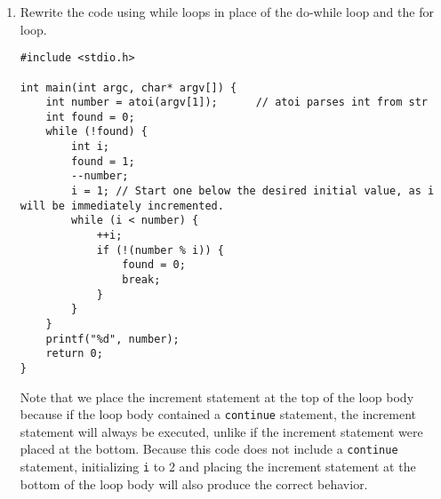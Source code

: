 \begin{enumerate}
\newpage
\item Rewrite the code using while loops in place of the do-while loop and the for loop.

\begin{answer}
\begin{verbatim}
#include <stdio.h>

int main(int argc, char* argv[]) {
    int number = atoi(argv[1]);      // atoi parses int from str
    int found = 0;
    while (!found) {
        int i; 
        found = 1;
        --number;
        i = 1; // Start one below the desired initial value, as i will be immediately incremented.
        while (i < number) {
            ++i;
            if (!(number % i)) {
                found = 0;
                break;
            }
        }
    }
    printf("%d", number);
    return 0;
}
\end{verbatim}

Note that we place the increment statement at the top of the loop body because if the loop body contained a \texttt{continue} statement, the increment statement will always be executed, unlike if the increment statement were placed at the bottom. Because this code does not include a \texttt{continue} statement, initializing \texttt{i} to 2 and placing the increment statement at the bottom of the loop body will also produce the correct behavior.
\end{answer}

\end{enumerate}
